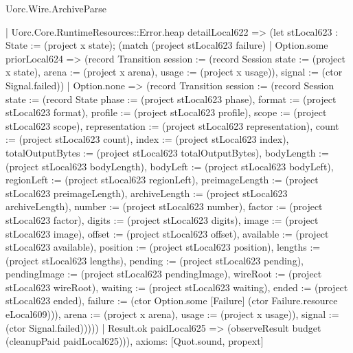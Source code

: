 \begin{lexlean}{Uorc.Wire.ArchiveParse}
\begin{semanticmodule}
{      | Uorc.Core.RuntimeResources::Error.heap detailLocal622 => (let stLocal623 : State := (project x state); (match (project stLocal623 failure)
        | Option.some priorLocal624 => (record Transition {session := (record Session {state := (project x state), arena := (project x arena), usage := (project x usage)}), signal := (ctor Signal.failed)})
        | Option.none => (record Transition {session := (record Session {state := (record State {phase := (project stLocal623 phase), format := (project stLocal623 format), profile := (project stLocal623 profile), scope := (project stLocal623 scope), representation := (project stLocal623 representation), count := (project stLocal623 count), index := (project stLocal623 index), totalOutputBytes := (project stLocal623 totalOutputBytes), bodyLength := (project stLocal623 bodyLength), bodyLeft := (project stLocal623 bodyLeft), regionLeft := (project stLocal623 regionLeft), preimageLength := (project stLocal623 preimageLength), archiveLength := (project stLocal623 archiveLength), number := (project stLocal623 number), factor := (project stLocal623 factor), digits := (project stLocal623 digits), image := (project stLocal623 image), offset := (project stLocal623 offset), available := (project stLocal623 available), position := (project stLocal623 position), lengths := (project stLocal623 lengths), pending := (project stLocal623 pending), pendingImage := (project stLocal623 pendingImage), wireRoot := (project stLocal623 wireRoot), waiting := (project stLocal623 waiting), ended := (project stLocal623 ended), failure := (ctor Option.some [Failure] (ctor Failure.resource eLocal609))}), arena := (project x arena), usage := (project x usage)}), signal := (ctor Signal.failed)}))))
    | Result.ok paidLocal625 => (observeResult budget (cleanupPaid paidLocal625))),
  axioms: [Quot.sound, propext]
}


\end{semanticmodule}
\end{lexlean}
